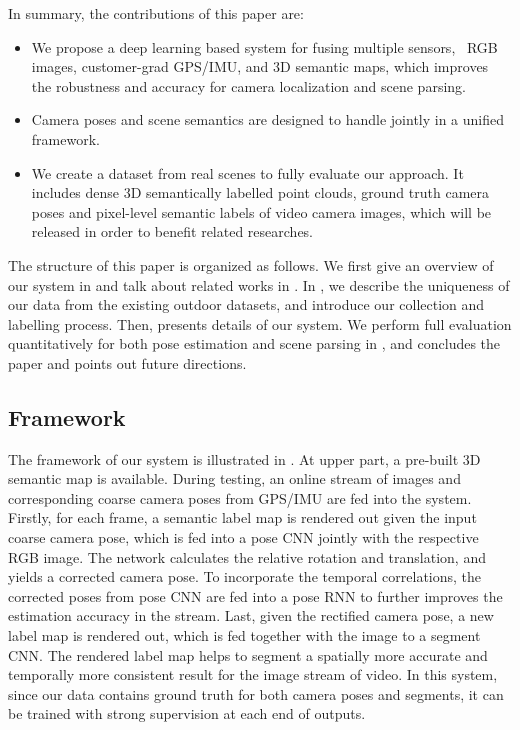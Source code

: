 In summary, the contributions of this paper are:
\begin{itemize}
\vspace{-0.5\baselineskip}
    \setlength{\itemsep}{-2pt}
    \item We propose a deep learning based system for fusing multiple sensors, \ie~RGB images, customer-grad GPS/IMU, and 3D semantic maps, which improves the robustness and accuracy for camera localization and scene parsing.
    \item Camera poses and scene semantics are designed to handle jointly in a unified framework.
    \item We create a dataset from real scenes to fully evaluate our approach. It includes dense 3D semantically labelled point clouds, ground truth camera poses and pixel-level semantic labels of video camera images, which will be released in order to benefit related researches.
\vspace{-0.4\baselineskip}
\end{itemize}

The structure of this paper is organized as follows. We first give an overview of our system in  and talk about related works in . In , we describe the uniqueness of our data from the existing outdoor datasets, and introduce our collection and labelling process. 
Then,  presents details of our system. We perform full evaluation quantitatively for both pose estimation and scene parsing in , and  concludes the paper and points out future directions. %

\vspace{-0.7\baselineskip}
\subsection{Framework}
\vspace{-0.6\baselineskip}
\label{sub:framework}
The framework of our system is illustrated in . At upper part, a pre-built 3D semantic map is available. During testing, an online stream of images and corresponding coarse camera poses from GPS/IMU are fed into the system. Firstly, for each frame, a semantic label map is rendered out given the input coarse camera pose, which is fed into a pose CNN jointly with the respective RGB image.  The network calculates the relative rotation and translation, and yields a corrected camera pose. To incorporate the temporal correlations, the corrected poses from pose CNN are fed into a pose RNN to further improves the estimation accuracy in the stream.
Last, given the rectified camera pose, a new label map is rendered out, which is fed together with the image to a segment CNN. The rendered label map helps to segment a spatially more accurate and temporally more consistent result for the image stream of video.
In this system, since our data contains ground truth for both camera poses and segments, it can be trained with strong supervision at each end of outputs.
